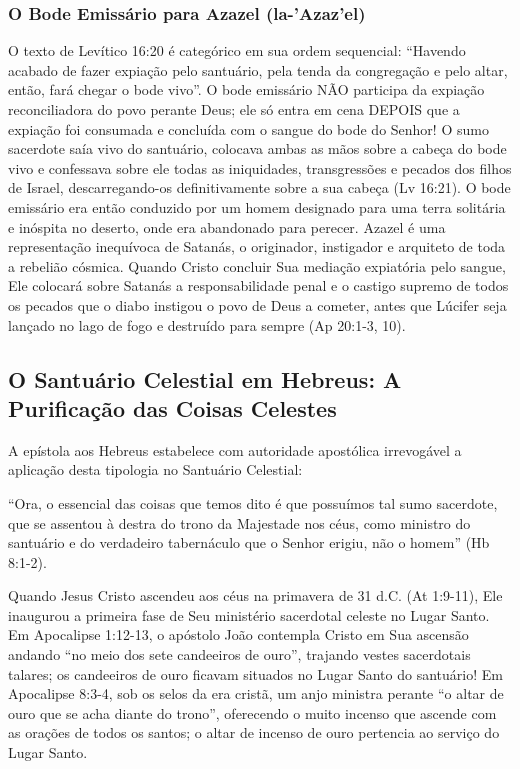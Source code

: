 \documentclass[11pt,a4paper,openany]{book}
\begin{document}
\subsubsection*{O Bode Emissário para Azazel (la-'Azaz'el)}
O texto de Levítico 16:20 é categórico em sua ordem sequencial: ``Havendo acabado de fazer expiação pelo santuário, pela tenda da congregação e pelo altar, então, fará chegar o bode vivo''. O bode emissário NÃO participa da expiação reconciliadora do povo perante Deus; ele só entra em cena DEPOIS que a expiação foi consumada e concluída com o sangue do bode do Senhor! O sumo sacerdote saía vivo do santuário, colocava ambas as mãos sobre a cabeça do bode vivo e confessava sobre ele todas as iniquidades, transgressões e pecados dos filhos de Israel, descarregando-os definitivamente sobre a sua cabeça (Lv 16:21). O bode emissário era então conduzido por um homem designado para uma terra solitária e inóspita no deserto, onde era abandonado para perecer. Azazel é uma representação inequívoca de Satanás, o originador, instigador e arquiteto de toda a rebelião cósmica. Quando Cristo concluir Sua mediação expiatória pelo sangue, Ele colocará sobre Satanás a responsabilidade penal e o castigo supremo de todos os pecados que o diabo instigou o povo de Deus a cometer, antes que Lúcifer seja lançado no lago de fogo e destruído para sempre (Ap 20:1-3, 10).



\subsection{O Santuário Celestial em Hebreus: A Purificação das Coisas Celestes}


A epístola aos Hebreus estabelece com autoridade apostólica irrevogável a aplicação desta tipologia no Santuário Celestial:

``Ora, o essencial das coisas que temos dito é que possuímos tal sumo sacerdote, que se assentou à destra do trono da Majestade nos céus, como ministro do santuário e do verdadeiro tabernáculo que o Senhor erigiu, não o homem'' (Hb 8:1-2).

Quando Jesus Cristo ascendeu aos céus na primavera de 31 d.C. (At 1:9-11), Ele inaugurou a primeira fase de Seu ministério sacerdotal celeste no Lugar Santo. Em Apocalipse 1:12-13, o apóstolo João contempla Cristo em Sua ascensão andando ``no meio dos sete candeeiros de ouro'', trajando vestes sacerdotais talares; os candeeiros de ouro ficavam situados no Lugar Santo do santuário! Em Apocalipse 8:3-4, sob os selos da era cristã, um anjo ministra perante ``o altar de ouro que se acha diante do trono'', oferecendo o muito incenso que ascende com as orações de todos os santos; o altar de incenso de ouro pertencia ao serviço do Lugar Santo.
\end{document}
